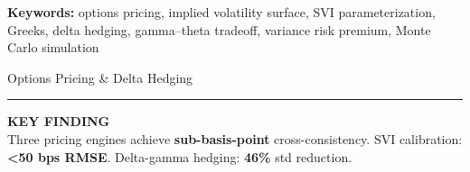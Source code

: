 \documentclass[11pt,a4paper]{article}
\begin{document}
\medskip
\noindent\textbf{Keywords:} options pricing, implied volatility surface, SVI parameterization, Greeks, delta hedging, gamma--theta tradeoff, variance risk premium, Monte Carlo simulation

\newpage

\thispagestyle{empty}

 \hfill {\small Options Pricing \& Delta Hedging}

\vspace{-0.2cm}
\noindent\rule{\textwidth}{0.4pt}

\vspace{0.3cm}

\noindent\colorbox{blue!10}{%
    \parbox{0.96\textwidth}{%
        \centering
        \textbf{\large KEY FINDING} \\[0.15cm]
        Three pricing engines achieve \textbf{sub-basis-point} cross-consistency.
        SVI calibration: \textbf{<50 bps RMSE}. Delta-gamma hedging: \textbf{46\%} std reduction.
    }%
}

\vspace{0.3cm}
\end{document}
